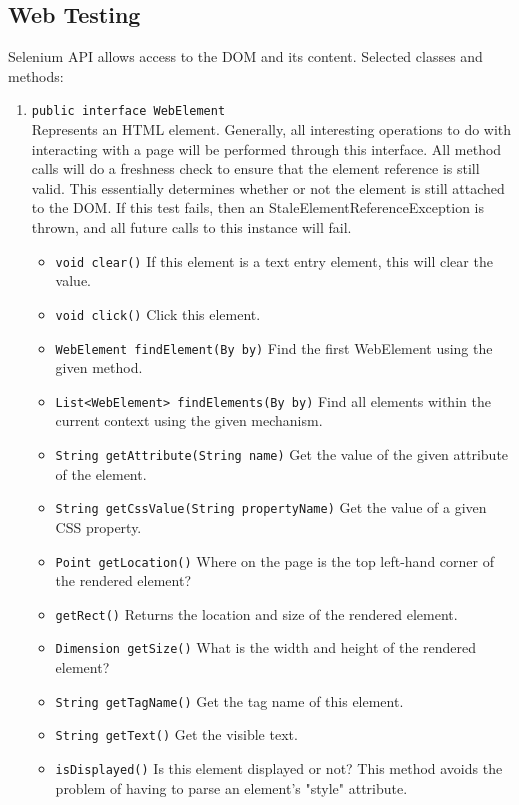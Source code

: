 \documentclass{article}
\begin{document}
\subsection{Web Testing}
Selenium API allows access to the DOM and its content. Selected classes and methods:
\begin{enumerate}
    \item \lstinline{public interface WebElement}\\Represents an HTML element. Generally, all interesting operations to do with interacting with a page will be performed through this interface. All method calls will do a freshness check to ensure that the element reference is still valid. This essentially determines whether or not the element is still attached to the DOM. If this test fails, then an StaleElementReferenceException is thrown, and all future calls to this instance will fail.
        \begin{itemize}
            \item \lstinline{void clear()} If this element is a text entry element, this will clear the value.
            \item \lstinline{void click()} Click this element.
            \item \lstinline{WebElement findElement(By by)} Find the first WebElement using the given method.
            \item \lstinline{List<WebElement> findElements(By by)} Find all elements within the current context using the given mechanism.
            \item \lstinline{String getAttribute(String name)} Get the value of the given attribute of the element.
            \item \lstinline{String getCssValue(String propertyName)} Get the value of a given CSS property.
            \item \lstinline{Point getLocation()} Where on the page is the top left-hand corner of the rendered element?
            \item \lstinline{getRect()} Returns the location and size of the rendered element.
            \item \lstinline{Dimension getSize()} What is the width and height of the rendered element?
            \item \lstinline{String	getTagName()} Get the tag name of this element.
            \item \lstinline{String	getText()} Get the visible text.
            \item \lstinline{isDisplayed()} Is this element displayed or not? This method avoids the problem of having to parse an element's "style" attribute.

\end{itemize}
\end{enumerate}
\end{document}
